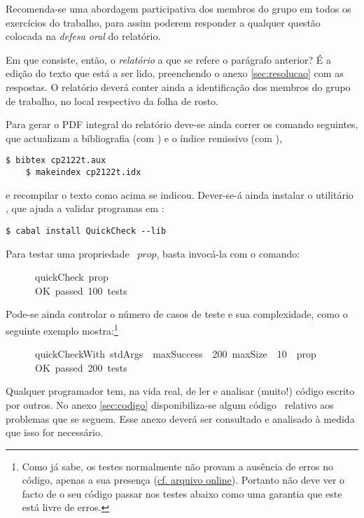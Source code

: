 \documentclass[a4paper]{article}
\newcommand{\Varid}[1]{\mathit{#1}}
\begin{document}
Recomenda-se uma abordagem participativa dos membros do grupo
em todos os exercícios do trabalho, para assim
poderem responder a qualquer questão colocada na
\emph{defesa oral} do relatório.

Em que consiste, então, o \emph{relatório} a que se refere o parágrafo anterior?
É a edição do texto que está a ser lido, preenchendo o anexo \ref{sec:resolucao}
com as respostas. O relatório deverá conter ainda a identificação dos membros
do grupo de trabalho, no local respectivo da folha de rosto.

Para gerar o PDF integral do relatório deve-se ainda correr os comando seguintes,
que actualizam a bibliografia (com \Bibtex) e o índice remissivo (com \Makeindex),
\begin{Verbatim}[fontsize=\small]
    $ bibtex cp2122t.aux
    $ makeindex cp2122t.idx
\end{Verbatim}
e recompilar o texto como acima se indicou. Dever-se-á ainda instalar o utilitário
\QuickCheck,
que ajuda a validar programas em \Haskell:
\begin{Verbatim}[fontsize=\small,commandchars=\\\{\}]
    $ cabal install QuickCheck --lib
\end{Verbatim}
Para testar uma propriedade \QuickCheck~\ensuremath{\Varid{prop}}, basta invocá-la com o comando:
\begin{tabbing}\ttfamily
~~~~~~quickCheck~prop\\
\ttfamily ~~~~~~OK~passed~100~tests
\end{tabbing}
Pode-se ainda controlar o número de casos de teste e sua complexidade,
como o seguinte exemplo mostra:\footnote{
Como já sabe, os testes normalmente não provam a ausência
de erros no código, apenas a sua presença (\href{https://www.cs.utexas.edu/users/EWD/transcriptions/EWD03xx/EWD303.html}{cf. arquivo online}). Portanto não deve ver o facto
de o seu código passar nos testes abaixo como uma garantia que este está livre de erros.}
\begin{tabbing}\ttfamily
~~~~~~quickCheckWith~stdArgs~~maxSuccess~~200~maxSize~~10~~prop\\
\ttfamily ~~~~~~OK~passed~200~tests
\end{tabbing}

Qualquer programador tem, na vida real, de ler e analisar (muito!) código
escrito por outros. No anexo \ref{sec:codigo} disponibiliza-se algum
código \Haskell\ relativo aos problemas que se seguem. Esse anexo deverá
ser consultado e analisado à medida que isso for necessário.
\end{document}
